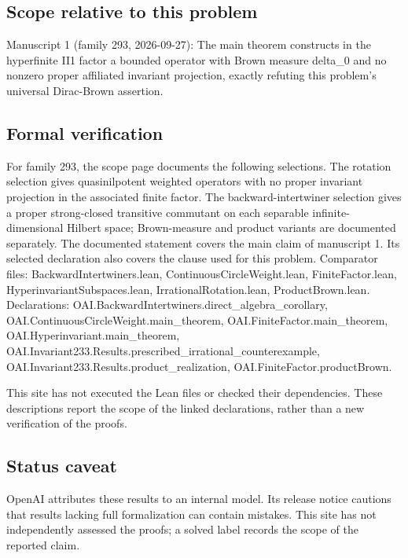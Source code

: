 \documentclass[11pt]{article}
\begin{document}
\subsection{Scope relative to this problem}
Manuscript 1 (family 293, 2026-09-27): The main theorem constructs in the hyperfinite II1 factor a bounded operator with Brown measure delta\_0 and no nonzero proper affiliated invariant projection, exactly refuting this problem’s universal Dirac-Brown assertion.

\subsection{Formal verification}
For family 293, the scope page documents the following selections. The rotation selection gives quasinilpotent weighted operators with no proper invariant projection in the associated finite factor. The backward-intertwiner selection gives a proper strong-closed transitive commutant on each separable infinite-dimensional Hilbert space; Brown-measure and product variants are documented separately. The documented statement covers the main claim of manuscript 1. Its selected declaration also covers the clause used for this problem. Comparator files: BackwardIntertwiners.lean, ContinuousCircleWeight.lean, FiniteFactor.lean, HyperinvariantSubspaces.lean, IrrationalRotation.lean, ProductBrown.lean. Declarations: OAI.BackwardIntertwiners.direct\_algebra\_corollary, OAI.ContinuousCircleWeight.main\_theorem, OAI.FiniteFactor.main\_theorem, OAI.Hyperinvariant.main\_theorem, OAI.Invariant233.Results.prescribed\_irrational\_counterexample, OAI.Invariant233.Results.product\_realization, OAI.FiniteFactor.productBrown.

This site has not executed the Lean files or checked their dependencies. These descriptions report the scope of the linked declarations, rather than a new verification of the proofs.

\subsection{Status caveat}
OpenAI attributes these results to an internal model. Its release notice cautions that results lacking full formalization can contain mistakes. This site has not independently assessed the proofs; a solved label records the scope of the reported claim.
\end{document}
